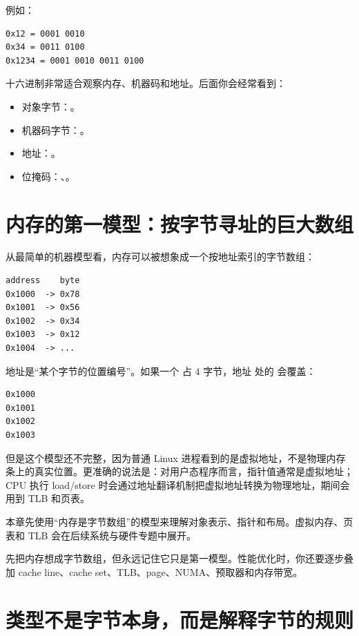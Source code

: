 例如：

\begin{lstlisting}
0x12 = 0001 0010
0x34 = 0011 0100
0x1234 = 0001 0010 0011 0100
\end{lstlisting}

十六进制非常适合观察内存、机器码和地址。后面你会经常看到：

\begin{itemize}
  \item 对象字节：。
  \item 机器码字节：。
  \item 地址：。
  \item 位掩码：、。
\end{itemize}

\section{内存的第一模型：按字节寻址的巨大数组}

从最简单的机器模型看，内存可以被想象成一个按地址索引的字节数组：

\begin{lstlisting}
address    byte
0x1000  -> 0x78
0x1001  -> 0x56
0x1002  -> 0x34
0x1003  -> 0x12
0x1004  -> ...
\end{lstlisting}

地址是“某个字节的位置编号”。如果一个  占 4 字节，地址  处的  会覆盖：

\begin{lstlisting}
0x1000
0x1001
0x1002
0x1003
\end{lstlisting}

但是这个模型还不完整，因为普通 Linux 进程看到的是虚拟地址，不是物理内存条上的真实位置。更准确的说法是：对用户态程序而言，指针值通常是虚拟地址；CPU 执行 load/store 时会通过地址翻译机制把虚拟地址转换为物理地址，期间会用到 TLB 和页表。

本章先使用“内存是字节数组”的模型来理解对象表示、指针和布局。虚拟内存、页表和 TLB 会在后续系统与硬件专题中展开。

\begin{mentalmodel}
先把内存想成字节数组，但永远记住它只是第一模型。性能优化时，你还要逐步叠加 cache line、cache set、TLB、page、NUMA、预取器和内存带宽。
\end{mentalmodel}

\section{类型不是字节本身，而是解释字节的规则}

